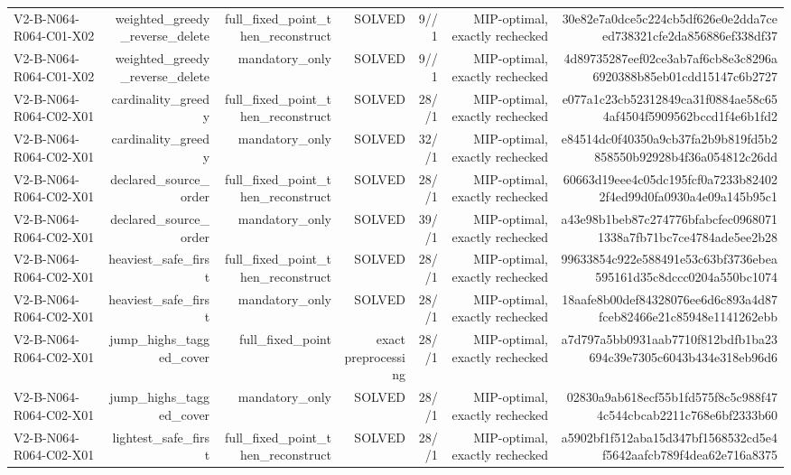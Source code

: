 {\begin{longtable}{lrrrrrr}
V2-B-N064-R064-C01-X02 & weighted\_greedy\_reverse\_delete & full\_fixed\_point\_then\_reconstruct & SOLVED & 9//1 & MIP-optimal, exactly rechecked & 30e82e7a0dce5c224cb5df626e0e2dda7ceed738321cfe2da856886ef338df37 \\
V2-B-N064-R064-C01-X02 & weighted\_greedy\_reverse\_delete & mandatory\_only & SOLVED & 9//1 & MIP-optimal, exactly rechecked & 4d89735287eef02ce3ab7af6cb8e3c8296a6920388b85eb01cdd15147c6b2727 \\
V2-B-N064-R064-C02-X01 & cardinality\_greedy & full\_fixed\_point\_then\_reconstruct & SOLVED & 28//1 & MIP-optimal, exactly rechecked & e077a1c23cb52312849ca31f0884ae58c654af4504f5909562bccd1f4e6b1fd2 \\
V2-B-N064-R064-C02-X01 & cardinality\_greedy & mandatory\_only & SOLVED & 32//1 & MIP-optimal, exactly rechecked & e84514dc0f40350a9cb37fa2b9b819fd5b2858550b92928b4f36a054812c26dd \\
V2-B-N064-R064-C02-X01 & declared\_source\_order & full\_fixed\_point\_then\_reconstruct & SOLVED & 28//1 & MIP-optimal, exactly rechecked & 60663d19eee4c05dc195fcf0a7233b824022f4ed99d0fa0930a4e09a145b95c1 \\
V2-B-N064-R064-C02-X01 & declared\_source\_order & mandatory\_only & SOLVED & 39//1 & MIP-optimal, exactly rechecked & a43e98b1beb87c274776bfabcfec09680711338a7fb71bc7ce4784ade5ee2b28 \\
V2-B-N064-R064-C02-X01 & heaviest\_safe\_first & full\_fixed\_point\_then\_reconstruct & SOLVED & 28//1 & MIP-optimal, exactly rechecked & 99633854c922e588491e53c63bf3736ebea595161d35c8dccc0204a550bc1074 \\
V2-B-N064-R064-C02-X01 & heaviest\_safe\_first & mandatory\_only & SOLVED & 28//1 & MIP-optimal, exactly rechecked & 18aafe8b00def84328076ee6d6c893a4d87fceb82466e21c85948e1141262ebb \\
V2-B-N064-R064-C02-X01 & jump\_highs\_tagged\_cover & full\_fixed\_point & exact preprocessing & 28//1 & MIP-optimal, exactly rechecked & a7d797a5bb0931aab7710f812bdfb1ba23694c39e7305c6043b434e318eb96d6 \\
V2-B-N064-R064-C02-X01 & jump\_highs\_tagged\_cover & mandatory\_only & SOLVED & 28//1 & MIP-optimal, exactly rechecked & 02830a9ab618ecf55b1fd575f8c5c988f474c544cbcab2211c768e6bf2333b60 \\
V2-B-N064-R064-C02-X01 & lightest\_safe\_first & full\_fixed\_point\_then\_reconstruct & SOLVED & 28//1 & MIP-optimal, exactly rechecked & a5902bf1f512aba15d347bf1568532cd5e4f5642aafcb789f4dea62e716a8375 \\

\end{longtable}}
